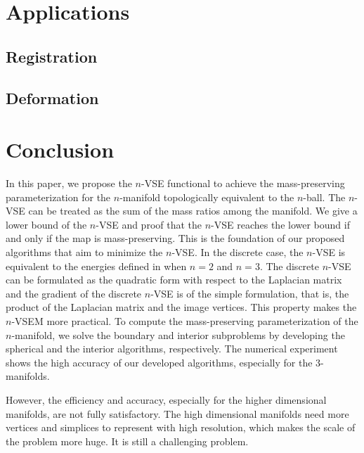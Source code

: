 \documentclass{article}
\begin{document}
\section{Applications}

\subsection{Registration}



\subsection{Deformation}



\section{Conclusion}

In this paper, we propose the $n$-VSE functional to achieve the mass-preserving parameterization for the $n$-manifold topologically equivalent to the $n$-ball. The $n$-VSE can be treated as the sum of the mass ratios among the manifold. We give a lower bound of the $n$-VSE and proof that the $n$-VSE reaches the lower bound if and only if the map is mass-preserving. This is the foundation of our proposed algorithms that aim to minimize the $n$-VSE. In the discrete case, the $n$-VSE is equivalent to the energies defined in \cite{MHWW19,MHTL19,TMWH23} when $n = 2$ and $n = 3$. The discrete $n$-VSE can be formulated as the quadratic form with respect to the Laplacian matrix and the gradient of the discrete $n$-VSE is of the simple formulation, that is, the product of the Laplacian matrix and the image vertices. This property makes the $n$-VSEM more practical. To compute the mass-preserving parameterization of the $n$-manifold, we solve the boundary and interior subproblems by developing the spherical and the interior algorithms, respectively. The numerical experiment shows the high accuracy of our developed algorithms, especially for the $3$-manifolds.

However, the efficiency and accuracy, especially for the higher dimensional manifolds, are not fully satisfactory. The high dimensional manifolds need more vertices and simplices to represent with high resolution, which makes the scale of the problem more huge. It is still a challenging problem.
\end{document}
